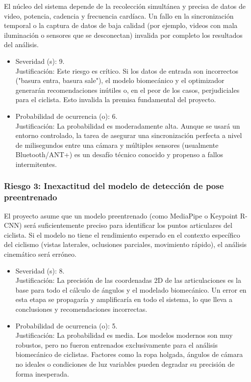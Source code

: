 \documentclass[
11pt, %
]{charter}
\begin{document}
El núcleo del sistema depende de la recolección simultánea y precisa de datos de video, potencia, cadencia y frecuencia cardíaca. Un fallo en la sincronización temporal o la captura de datos de baja calidad (por ejemplo, videos con mala iluminación o sensores que se desconectan) invalida por completo los resultados del análisis.
\begin{itemize}
  \item Severidad (s): 9.\\
  Justificación: Este riesgo es crítico. Si los datos de entrada son incorrectos ("basura entra, basura sale"), el modelo biomecánico y el optimizador generarán recomendaciones inútiles o, en el peor de los casos, perjudiciales para el ciclista. Esto invalida la premisa fundamental del proyecto.
  \item Probabilidad de ocurrencia (o): 6.\\
  Justificación: La probabilidad es moderadamente alta. Aunque se usará un entorno controlado, la tarea de asegurar una sincronización perfecta a nivel de milisegundos entre una cámara y múltiples sensores (usualmente Bluetooth/ANT+) es un desafío técnico conocido y propenso a fallos intermitentes.
\end{itemize}

\subsubsection*{Riesgo 3: Inexactitud del modelo de detección de pose preentrenado}

El proyecto asume que un modelo preentrenado (como MediaPipe o Keypoint R-CNN) será suficientemente preciso para identificar los puntos articulares del ciclista. Si el modelo no tiene el rendimiento esperado en el contexto específico del ciclismo (vistas laterales, oclusiones parciales, movimiento rápido), el análisis cinemático será erróneo.
\begin{itemize}
  \item Severidad (s): 8.\\
  Justificación: La precisión de las coordenadas 2D de las articulaciones es la base para todo el cálculo de ángulos y el modelado biomecánico. Un error en esta etapa se propagaría y amplificaría en todo el sistema, lo que lleva a conclusiones y recomendaciones incorrectas.
  \item Probabilidad de ocurrencia (o): 5.\\
  Justificación: La probabilidad es media. Los modelos modernos son muy robustos, pero no fueron entrenados exclusivamente para el análisis biomecánico de ciclistas. Factores como la ropa holgada, ángulos de cámara no ideales o condiciones de luz variables pueden degradar su precisión de forma inesperada.
\end{itemize}
\end{document}
